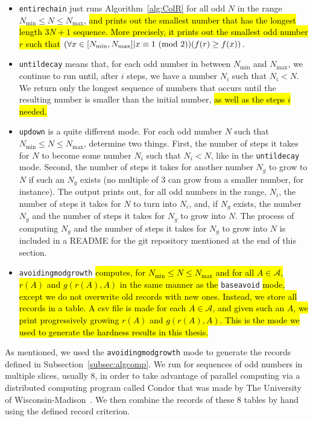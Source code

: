 \begin{itemize}
    \item {\tt entirechain} just runs Algorithm~\ref{alg:ColR} for all odd $N$ in the range $N_{\min} \leq N \leq N_{\max}$, \hl{and prints out the smallest number that has the longest length $3N+1$ sequence. More precisely, it prints out the smallest odd number $r$ such that} $(\forall x \in [N_{\min},N_{\max}] | x \equiv 1 \ (\mathrm{mod}\ 2)) (f(r) \geq f(x))$.
    \item {\tt untildecay} means that, for each odd number in between $N_{\min}$ and $N_{\max}$, we continue to run until, after $i$ steps, we have a number $N_i$ such that $N_i < N$. We return only the longest sequence of numbers that occurs until the resulting number is smaller than the initial number, \hl{as well as the steps $i$ needed. }%
    \item {\tt updown} is a quite different mode. For each odd number $N$ such that $N_{\min}\leq N \leq N_{\max}$, determine two things. First, the number of steps it takes for $N$ to become some number $N_i$ such that $N_i < N$, like in the {\tt untildecay} mode. Second, the number of steps it takes for another number $N_g$ to grow to $N$ if such an $N_g$ exists (no multiple of 3 can grow from a smaller number, for instance). The output prints out, for all odd numbers in the range, $N_i$, the number of steps it takes for $N$ to turn into $N_i$, and, if $N_g$ exists, the number $N_g$ and the number of steps it takes for $N_g$ to grow into $N$. The process of computing $N_g$ and the number of steps it takes for $N_g$ to grow into $N$ is included in a README for the git repository mentioned at the end of this section.
    \item {\tt avoidingmodgrowth} \hl{computes, for $N_{\min}\leq N \leq N_{\max}$ and for all $A \in \mathcal{A}$, $r(A)$ and $g(r(A),A)$ in the same manner as the} {\tt baseavoid} \hl{mode, except we do not overwrite old records with new ones. Instead, we store all records in a table. A csv file is made for each $A \in \mathcal{A}$, and given such an $A$, we print progressively growing $r(A)$ and $g(r(A),A)$. This is the mode we used to generate the hardness results in this thesis.}
\end{itemize}
As mentioned, we used the {\tt avoidingmodgrowth} mode to generate the records defined in Subsection~\ref{subsec:algcomp}. We run for sequences of odd numbers in multiple slices, usually 8, in order to take advantage of parallel computing via a distributed computing program called Condor that was made by The University of Wisconsin-Madison~\cite{Thain:2005:DCP:1064323.1064336}. We then combine the records of these 8 tables by hand using the defined record criterion. \par

